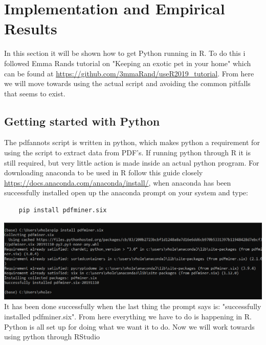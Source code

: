 \documentclass{article}
\begin{document}
\section{Implementation and Empirical Results}
In this section it will be shown how to get Python running in R. To do this i followed Emma Rands tutorial on "Keeping an exotic pet in your home" which can be found at \url{https://github.com/3mmaRand/useR2019_tutorial}. From here we will move towards using the actual script and avoiding the common pitfalls that seems to exist.  
\subsection{Getting started with Python}
The pdfannots script is written in python, which makes python a requirement for using the script to extract data from PDF’s. If running python through R it is still required, but very little action is made inside an actual python program. For downloading anaconda to be used in R follow this guide closely \url{https://docs.anaconda.com/anaconda/install/}, when anaconda has been successfully installed open up the anaconda prompt on your system and type: 
\begin{verbatim}
    pip install pdfminer.six
\end{verbatim}
\includegraphics[scale=0.53]{Install_pdfminer_six.PNG}\newline
It has been done successfully when the last thing the prompt says is: "successfully installed pdfminer.six". From here everything we have to do is happening in R. Python is all set up for doing what we want it to do. Now we will work towards using python through RStudio
\end{document}
